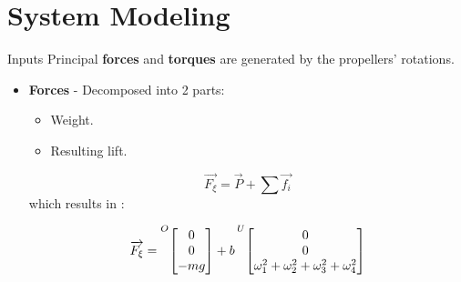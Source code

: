 \documentclass{thesisbeamer}
\begin{document}
\section{System Modeling}

\begin{frame}[t]{Inputs} \vspace{4pt}
Principal \textbf{forces} and \textbf{torques} are generated  by the propellers' rotations.

\begin{itemize}
	\item \textbf{Forces} - Decomposed into 2 parts:
	
	\begin{itemize}
		\item Weight.
		\item Resulting lift.
	\end{itemize}
	
	\begin{equation}
\overrightarrow{F_{\xi}}= \overrightarrow{P} + \sum \overrightarrow{f_i}
\end{equation} 
which results in \cite{Fantoni2016}:

\begin{equation}
\overrightarrow{F_{\xi}} =
\prescript{O}{}{\begin{bmatrix}
0 \\
0 \\
-mg \\
\end{bmatrix}}
+ b \prescript{U}{}{\begin{bmatrix}
0 \\ 
0 \\
\omega_1^2 + \omega_2^2 + \omega_3^2 + \omega_4^2\\
\end{bmatrix}}
\end{equation}
\end{itemize}
\end{frame}
\end{document}
